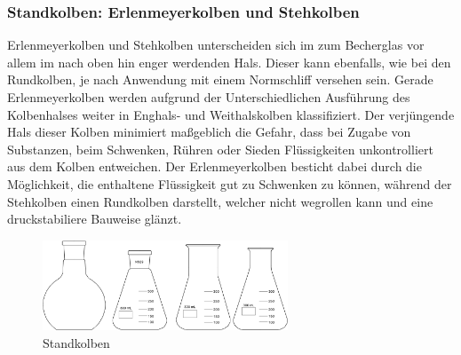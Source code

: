 \subsubsection{Standkolben: Erlenmeyerkolben und Stehkolben}
Erlenmeyerkolben und Stehkolben unterscheiden sich im zum Becherglas vor allem im nach oben hin enger werdenden Hals. Dieser kann ebenfalls, wie bei den Rundkolben, je nach Anwendung mit einem Normschliff versehen sein. Gerade Erlenmeyerkolben werden aufgrund der Unterschiedlichen Ausführung des Kolbenhalses weiter in Enghals- und Weithalskolben klassifiziert. Der verjüngende Hals dieser Kolben minimiert maßgeblich die Gefahr, dass bei Zugabe von Substanzen, beim Schwenken, Rühren oder Sieden Flüssigkeiten unkontrolliert aus dem Kolben entweichen. 
Der Erlenmeyerkolben besticht dabei durch die Möglichkeit, die enthaltene Flüssigkeit gut zu Schwenken zu können, während der Stehkolben einen Rundkolben darstellt, welcher nicht wegrollen kann und eine druckstabiliere Bauweise glänzt.

\begin{figure}[h!]
	\centering
	\includegraphics[width=0.65\textwidth]{img/standkolben}
	\caption{Standkolben}
	\label{fig:standkolben}
\end{figure}
\FloatBarrier

\begin{table}[h!]
	\renewcommand*{\arraystretch}{1.2}
	\centering
	\caption{Vergleich von Becherglas, Rund- und Standkolben}
	\label{tab:vergleich_becherglas}
\end{table}%
\FloatBarrier

